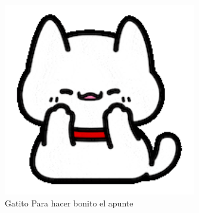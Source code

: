 \documentclass[12pt, letterpaper]{article}
\begin{document}
\begin{figure}[h!]
    \centering
    \includegraphics[width=0.75\textwidth]{Gat}
    \caption{Gatito Para hacer bonito el apunte}
    \label{fig:Gat}
\end{figure}


\newpage
\end{document}
